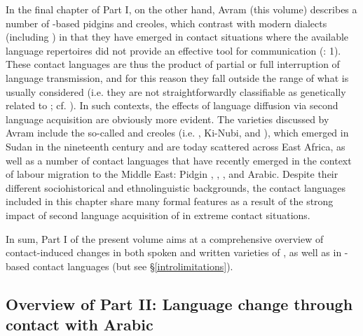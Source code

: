\documentclass[output=paper]{langsci/langscibook}
\begin{document}
In the final chapter of Part I, on the other hand, Avram (this volume) describes a number of -based pidgins and creoles, which contrast with modern  dialects (including ) in that they have emerged in contact situations where the available language repertoires did not provide an effective tool for communication (\citealt{BakkerMatras2013intro}: 1). These contact languages are thus the product of partial or full interruption of language {transmission}, and for this reason they fall outside the range of what is usually considered  (i.e. they are not straightforwardly classifiable as genetically related to ; cf. \citealt{McMahon2013}). In such contexts, the effects of language {diffusion} via second language acquisition are obviously more evident. The varieties discussed by Avram include the so-called  and creoles (i.e.  , Ki-Nubi, and ), which emerged in Sudan in the nineteenth century and are today scattered across East Africa, as well as a number of contact languages that have recently emerged in the context of labour migration to the Middle East:  Pidgin , ,  , and  Arabic. Despite their different sociohistorical and ethnolinguistic backgrounds, the contact languages included in this chapter share many formal features as a result of the strong impact of second language acquisition of  in extreme contact situations.

In sum, Part I of the present volume aims at a comprehensive overview of contact-induced changes in both spoken and written varieties of , as well as in -based contact languages (but see §\ref{introlimitations}).

\subsection{Overview of Part II: Language change through contact
with Arabic}\label{intropartIIoverview}
\end{document}
